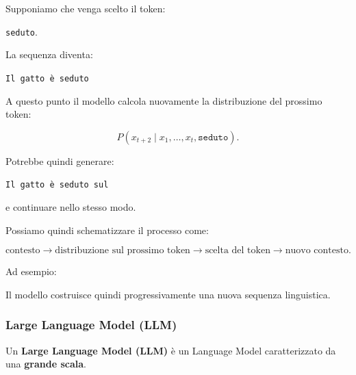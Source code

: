 Supponiamo che venga scelto il token:

\begin{center}
\texttt{seduto}.
\end{center}

La sequenza diventa:

\begin{center}
\texttt{Il gatto è seduto}
\end{center}

A questo punto il modello calcola nuovamente la distribuzione del prossimo token:

\begin{equation}
P(x_{t+2}\mid x_1,\ldots,x_t,\texttt{seduto}).
\end{equation}

Potrebbe quindi generare:

\begin{center}
\texttt{Il gatto è seduto sul}
\end{center}

e continuare nello stesso modo.

Possiamo quindi schematizzare il processo come:

\begin{equation}
\text{contesto}
\longrightarrow
\text{distribuzione sul prossimo token}
\longrightarrow
\text{scelta del token}
\longrightarrow
\text{nuovo contesto}.
\end{equation}

Ad esempio:

\begin{center}
\end{center}

Il modello costruisce quindi progressivamente una nuova sequenza linguistica.

\subsubsection{Large Language Model (LLM)}

Un \textbf{Large Language Model (LLM)} è un Language Model caratterizzato da una \textbf{grande scala}.

